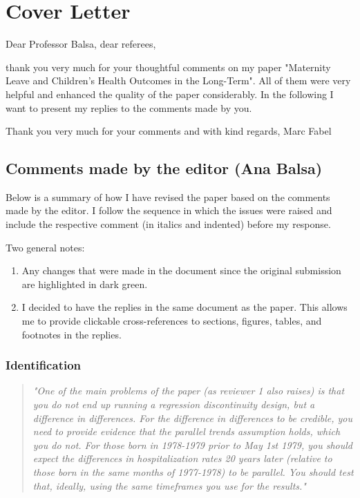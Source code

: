 \thispagestyle{empty}
\chapter*{Cover Letter}



Dear Professor Balsa, dear referees, 

thank you very much for your thoughtful comments on my paper "Maternity Leave and Children's Health Outcomes in the Long-Term". All of them were very helpful and enhanced the quality of the paper considerably. In the following I want to present my replies to the comments made by you. 



Thank you very much for your comments and with kind regards,
Marc Fabel 



\newpage
\section*{Comments made by the editor (Ana Balsa)}

Below is a summary of how I have revised the paper based on the comments made by the editor. I follow the sequence in which the issues were raised and include the respective comment (in italics and indented) before my response.

Two general notes:
\begin{enumerate}
	\item Any changes that were made in the document since the original submission are highlighted in dark green. 
	\item I decided to have the replies in the same document as the paper. This allows me to provide clickable cross-references to sections, figures, tables, and footnotes in the replies.
\end{enumerate}







\subsection*{Identification}

\begin{quote}
\textit{"One of the main problems of the paper (as reviewer 1 also raises) is that you do not end up running a regression discontinuity design, but a difference in differences. For the difference in differences to be credible, you need to provide evidence that the parallel trends assumption holds, which you do not. For those born in 1978-1979 prior to May 1st 1979, you should expect the differences in hospitalization rates 20 years later (relative to those born in the same months of 1977-1978) to be parallel. You should test that, ideally, using the same timeframes you use for the results."}
\end{quote}

